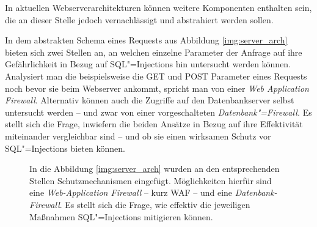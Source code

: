 
In aktuellen Webserverarchitekturen können weitere Komponenten enthalten sein, die an dieser Stelle jedoch vernachlässigt und abstrahiert werden sollen.

In dem abstrakten Schema eines Requests aus Abbildung \ref{img:server_arch} bieten sich zwei Stellen an, an welchen einzelne Parameter der Anfrage auf ihre Gefährlichkeit in Bezug auf SQL"=Injections hin untersucht werden können. Analysiert man die beispielsweise die GET und POST Parameter eines Requests noch bevor sie beim Webserver ankommt, spricht man von einer \emph{Web Application Firewall}. Alternativ können auch die Zugriffe auf den Datenbankserver selbst untersucht werden -- und zwar von einer vorgeschalteten \emph{Datenbank"=Firewall.} Es stellt sich die Frage, inwiefern die beiden Ansätze in Bezug auf ihre Effektivität miteinander vergleichbar sind -- und ob sie einen wirksamen Schutz vor SQL"=Injections bieten können.


\begin{figure}[htbp!]
\begin{margincap}
\centering
{}
\caption[Webserverarchitektur mit WAF und Datenbankfirewall]{In die Abbildung \ref{img:server_arch} wurden an den entsprechenden Stellen Schutzmechanismen eingefügt. Möglichkeiten hierfür sind eine \emph{Web-Application Firewall} -- kurz WAF -- und eine \emph{Datenbank-Firewall}. Es stellt sich die Frage, wie effektiv die jeweiligen Maßnahmen SQL"=Injections mitigieren können.}
\label{img:protected_server_arch}
\end{margincap}
\end{figure}


